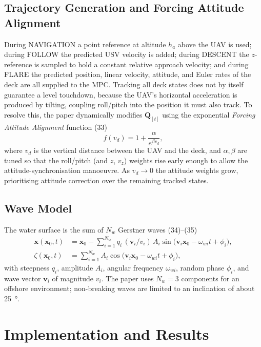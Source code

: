 \documentclass[12pt,a4paper]{report}
\begin{document}
\section{Trajectory Generation and Forcing Attitude Alignment}
During NAVIGATION a point reference at altitude $h_a$ above the UAV is used; during FOLLOW the predicted USV velocity is added; during DESCENT the $z$-reference is sampled to hold a constant relative approach velocity; and during FLARE the predicted position, linear velocity, attitude, and Euler rates of the deck are all supplied to the MPC. Tracking all deck states does not by itself guarantee a level touchdown, because the UAV's horizontal acceleration is produced by tilting, coupling roll/pitch into the position it must also track. To resolve this, the paper dynamically modifies $\bm{Q}_{[t]}$ using the exponential \emph{Forcing Attitude Alignment} function (33)
\begin{equation}\label{eq:faa}
f(v_d) = 1 + \frac{\alpha}{e^{\beta v_d}},
\end{equation}
where $v_d$ is the vertical distance between the UAV and the deck, and $\alpha,\beta$ are tuned so that the roll/pitch (and $z$, $v_z$) weights rise early enough to allow the attitude-synchronisation manoeuvre. As $v_d\to0$ the attitude weights grow, prioritising attitude correction over the remaining tracked states.

\section{Wave Model}
The water surface is the sum of $N_w$ Gerstner waves (34)--(35)
\begin{align}
\bm{x}(\bm{x}_0,t) &= \bm{x}_0 - \sum_{i=1}^{N_w} q_i\,(\bm{v}_i/v_i)\,A_i \sin\!\big(\bm{v}_i\bm{x}_0 - \omega_{wi}t + \phi_i\big), \label{eq:gerstnerx}\\
\zeta(\bm{x}_0,t) &= \sum_{i=1}^{N_w} A_i \cos\!\big(\bm{v}_i\bm{x}_0 - \omega_{wi}t + \phi_i\big), \label{eq:gerstnerz}
\end{align}
with steepness $q_i$, amplitude $A_i$, angular frequency $\omega_{wi}$, random phase $\phi_i$, and wave vector $\bm{v}_i$ of magnitude $v_i$. The paper uses $N_w=3$ components for an offshore environment; non-breaking waves are limited to an inclination of about \SI{25}{\degree}.

\chapter{Implementation and Results}\label{ch:impl}
\end{document}

